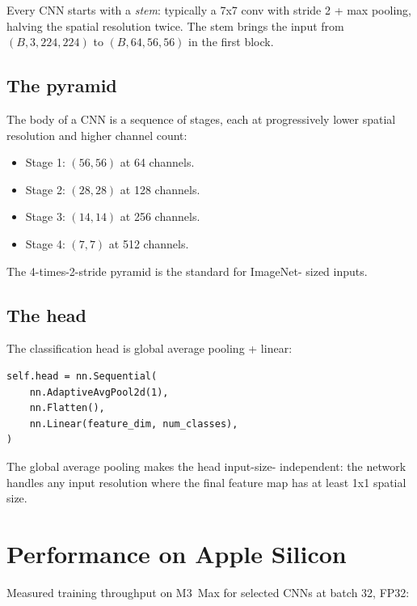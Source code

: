 Every CNN starts with a \emph{stem}: typically a 7x7 conv with
stride 2 + max pooling, halving the spatial resolution twice.
The stem brings the input from $(B, 3, 224, 224)$ to
$(B, 64, 56, 56)$ in the first block.

\subsection{The pyramid}
\label{ssec:vision_cnn:pyramid}

The body of a CNN is a sequence of stages, each at progressively
lower spatial resolution and higher channel count:

\begin{itemize}
  \item Stage 1: $(56, 56)$ at 64 channels.
  \item Stage 2: $(28, 28)$ at 128 channels.
  \item Stage 3: $(14, 14)$ at 256 channels.
  \item Stage 4: $(7, 7)$ at 512 channels.
\end{itemize}

The 4-times-2-stride pyramid is the standard for ImageNet-
sized inputs.

\subsection{The head}
\label{ssec:vision_cnn:head}

The classification head is global average pooling + linear:
\begin{lstlisting}[style=lucid,language=LucidPython]
self.head = nn.Sequential(
    nn.AdaptiveAvgPool2d(1),
    nn.Flatten(),
    nn.Linear(feature_dim, num_classes),
)
\end{lstlisting}

The global average pooling makes the head input-size-
independent: the network handles any input resolution where the
final feature map has at least 1x1 spatial size.

\section{Performance on Apple Silicon}
\label{sec:vision_cnn:perf}

Measured training throughput on M3~Max for selected CNNs at
batch 32, FP32:

